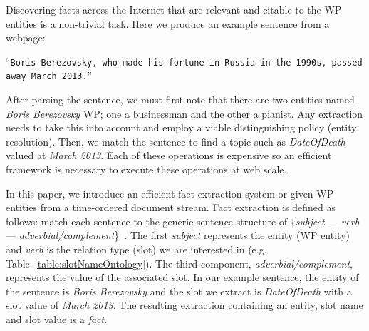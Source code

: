 \documentclass[letterpaper]{article}
\begin{document}
Discovering facts across the Internet that are relevant and citable to the WP entities is a non-trivial task.
Here we produce an example sentence from a webpage: 

``{\small \texttt{Boris Berezovsky, who made his fortune in Russia in the 1990s, passed away March 2013.}}''

After parsing the sentence, we must first note that there are two entities named \textit{Boris Berezovsky} WP; one a businessman and the other a pianist.
Any extraction needs to take this into account and employ a viable distinguishing policy (entity resolution).
Then, we match the sentence to find a topic such as \textit{DateOfDeath} valued at \textit{March 2013}.
Each of these operations is expensive so an efficient framework is necessary to execute these operations at web scale.


In this paper, we introduce an efficient fact extraction system or given WP entities from a time-ordered document stream.
Fact extraction is defined as follows: match each sentence to the generic sentence structure of \{\textit{subject} --- \textit{verb} --- \textit{adverbial/complement}\}~\cite{sentencePatterns08}.
The first \textit{subject} represents the entity (WP entity) and \textit{verb} is the relation type (slot) we are interested in (e.g. Table~\ref{table:slotNameOntology}).
The third component, \textit{adverbial/complement}, represents the value of the associated slot.
In our example sentence, the entity of the sentence is \textit{Boris Berezovsky} and the slot we extract is
\textit{DateOfDeath} with a slot value of \textit{March 2013}.
The resulting extraction containing an entity, slot name and slot value is a \emph{fact}.


\end{document}
